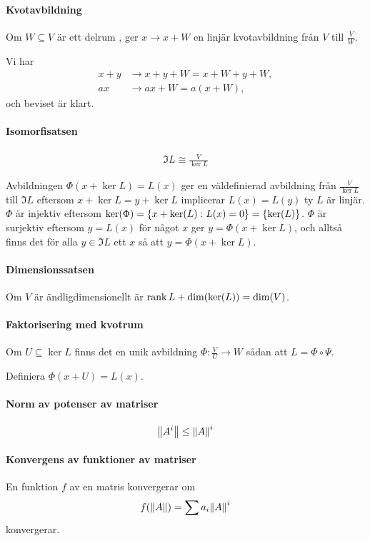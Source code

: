 \paragraph{Kvotavbildning}
Om $W\subseteq V$ är ett delrum , ger $x\to x + W$ en linjär kvotavbildning från $V$ till $\frac{V}{W}$.

\proof
Vi har
\begin{align*}
	x + y &\to x + y + W = x + W + y + W, \\
	ax    &\to ax + W = a(x + W),
\end{align*}
och beviset är klart.

\paragraph{Isomorfisatsen}
\begin{align*}
	\Im{L} \cong \frac{V}{\ker{L}}
\end{align*}

\proof
Avbildningen $\Phi(x + \ker{L}) = L(x)$ ger en väldefinierad avbildning från $\frac{V}{\ker{L}}$ till $\Im{L}$ eftersom $x + \ker{L} = y + \ker{L}$ implicerar $L(x) = L(y)$ ty $L$ är linjär. $\Phi$ är injektiv eftersom $\ker{\Phi} = \set{x + \ker{L}}{L(x) = 0} = \set{\ker{L}}{}$. $\Phi$ är surjektiv eftersom $y = L(x)$ för något $x$ ger $y = \Phi(x + \ker{L})$, och alltså finns det för alla $y\in\Im{L}$ ett $x$ så att $y = \Phi(x + \ker{L})$.

\paragraph{Dimensionssatsen}
Om $V$ är ändligdimensionellt är $\rank{L} + \text{dim}(\text{ker}(L)) = \text{dim}(V)$.

\proof

\paragraph{Faktorisering med kvotrum}
Om $U\subseteq\ker{L}$ finns det en unik avbildning $\Phi: \frac{V}{U}\to W$ sådan att $L = \Phi\circ\Psi$.

\proof
Definiera $\Phi(x + U) = L(x)$.

\paragraph{Norm av potenser av matriser}
\begin{align*}
	\norm{A^{i}}\leq \norm{A}^{i}
\end{align*}

\proof

\paragraph{Konvergens av funktioner av matriser}
En funktion $f$ av en matris konvergerar om
\begin{align*}
	f(\norm{A}) = \sum a_{i}\norm{A}^{i}
\end{align*}
konvergerar.